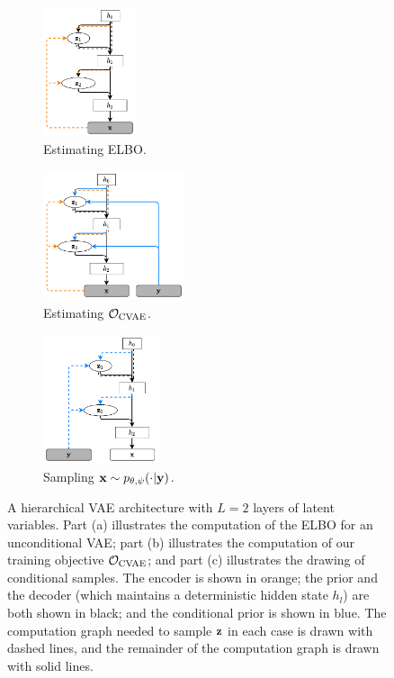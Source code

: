 \begin{figure}[t]
  \centering
  \begin{subfigure}[b]{.32\textwidth}
    \centering
    \includegraphics[height=3.8cm]{figs/cigcvae/arch_small-standard.pdf}
    \caption{Estimating ELBO.}
    \label{fig:cigcvae-hierarchical-vae}
  \end{subfigure}
  \begin{subfigure}[b]{.32\textwidth}
    \centering
    \includegraphics[height=3.8cm]{figs/cigcvae/arch_small-forward.pdf}
    \caption{Estimating ${\mathcal{O}}_\text{CVAE}$.}
    \label{fig:cigcvae-forward-arch}
  \end{subfigure}
  \begin{subfigure}[b]{.32\textwidth}
    \centering
    \includegraphics[height=3.8cm]{figs/cigcvae/arch_small-sampling.pdf}
    \caption{Sampling ${\mathbf{x}}\sim p_{\theta,\psi}(\cdot|{\mathbf{y}})$.}
    \label{fig:cigcvae-reverse-arch}
  \end{subfigure}
  \vspace{-1mm}
  \caption{A hierarchical VAE architecture with $L=2$ layers of latent
    variables. Part (a) illustrates the computation of the ELBO for an
    unconditional VAE; part (b) illustrates the computation of our training
    objective ${\mathcal{O}}_\text{CVAE}$; and part (c) illustrates the drawing
    of conditional samples. The encoder is shown in orange; the prior and the
    decoder (which maintains a deterministic hidden state $h_{l}$) are both
    shown in black; and the conditional prior is shown in blue. The computation
    graph needed to sample ${\mathbf{z}}$ in each case is drawn with dashed lines, and
    the remainder of the computation graph is drawn with solid lines.}
  \label{fig:cigcvae-conditional-architectures}
  \vspace{-2mm}
\end{figure}


